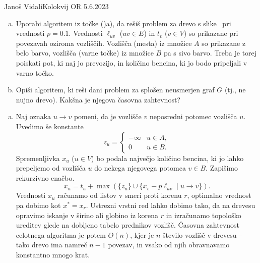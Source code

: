 \begin{naloga}{Janoš Vidali}{Kolokvij OR 5.6.2023}
\begin{vprasanje}
\begin{enumerate}[(a)]
\item Uporabi algoritem iz točke ()a),
da rešiš problem za drevo s slike~\fig
pri vrednosti $p = 0.1$.
Vrednosti $\ell_{uv}$ ($uv \in E$) in $t_v$ ($v \in V$)
so prikazane pri povezavah oziroma vozliščih.
Vozlišča (mesta) iz množice $A$ so prikazane z belo barvo,
vozlišča (varne točke) iz množice $B$ pa s sivo barvo.
Treba je torej poiskati pot, ki naj jo prevozijo,
in količino bencina, ki jo bodo pripeljali v varno točko.

\item Opiši algoritem, ki reši dani problem za splošen neusmerjen graf $G$
(tj., ne nujno drevo).
Kakšna je njegova časovna zahtevnost?
\end{enumerate}

\begin{slika}
\makebox[\textwidth][c]{
\pgfslika
}
\end{slika}
\end{vprasanje}

\begin{odgovor}
\begin{enumerate}[(a)]
\item Naj oznaka $u \to v$ pomeni,
da je vozlišče $v$ neposredni potomec vozlišča $u$.
Uvedimo še konstante
$$
z_u = \begin{cases}
-\infty & u \in A, \\
0 & u \in B.
\end{cases}
$$
Spremenljivka $x_u$ ($u \in V$) bo podala največjo količino bencina,
ki jo lahko prepeljemo od vozlišča $u$ do nekega njegovega potomca $v \in B$.
Zapišimo rekurzivno enačbo.
$$
x_u = t_u + \max\left(\{z_u\} \cup \{x_v - p \ell_{uv} \mid u \to v\}\right) .
$$
Vrednosti $x_u$ računamo od listov v smeri proti korenu $r$,
optimalno vrednost pa dobimo kot $x^* = x_r$.
Ustrezni vrstni red lahko dobimo tako,
da na drevesu opravimo iskanje v širino ali globino iz korena $r$
in izračunamo topološko ureditev glede na dobljeno tabelo prednikov vozlišč.
Časovna zahtevnost celotnega algoritma je potem $O(n)$,
kjer je $n$ število vozlišč v drevesu
-- tako drevo ima namreč $n-1$ povezav,
in vsako od njih obravnavamo konstantno mnogo krat.


\end{enumerate}
\end{odgovor}
\end{naloga}
